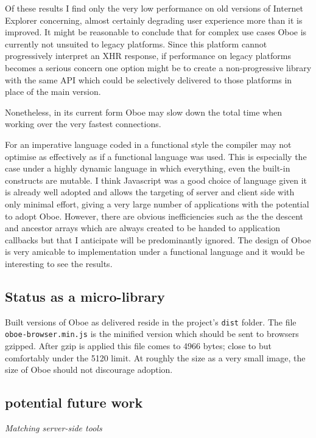 \documentclass[]{article}
\begin{document}
Of these results I find only the very low performance on old versions of
Internet Explorer concerning, almost certainly degrading user experience
more than it is improved. It might be reasonable to conclude that for
complex use cases Oboe is currently not unsuited to legacy platforms.
Since this platform cannot progressively interpret an XHR response, if
performance on legacy platforms becomes a serious concern one option
might be to create a non-progressive library with the same API which
could be selectively delivered to those platforms in place of the main
version.

Nonetheless, in its current form Oboe may slow down the total time when
working over the very fastest connections.

For an imperative language coded in a functional style the compiler may
not optimise as effectively as if a functional language was used. This
is especially the case under a highly dynamic language in which
everything, even the built-in constructs are mutable. I think Javascript
was a good choice of language given it is already well adopted and
allows the targeting of server and client side with only minimal effort,
giving a very large number of applications with the potential to adopt
Oboe. However, there are obvious inefficiencies such as the the descent
and ancestor arrays which are always created to be handed to application
callbacks but that I anticipate will be predominantly ignored. The
design of Oboe is very amicable to implementation under a functional
language and it would be interesting to see the results.

\subsection{Status as a micro-library}

Built versions of Oboe as delivered reside in the project's
\texttt{dist} folder. The file \texttt{oboe-browser.min.js} is the
minified version which should be sent to browsers gzipped. After gzip is
applied this file comes to 4966 bytes; close to but comfortably under
the 5120 limit. At roughly the size as a very small image, the size of
Oboe should not discourage adoption.

\subsection{potential future work}

\emph{Matching server-side tools}
\end{document}

